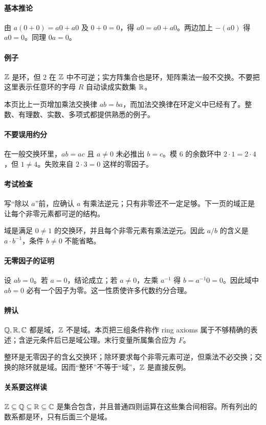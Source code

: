 \paragraph{基本推论}由 $a(0+0)=a0+a0$ 及 $0+0=0$，得 $a0=a0+a0$。两边加上 $-(a0)$ 得 $a0=0$。同理 $0a=0$。
\paragraph{例子}$\mathbb{Z}$ 是环，但 $2$ 在 $\mathbb{Z}$ 中不可逆；实方阵集合也是环，矩阵乘法一般不交换。不要把这里表示任意环的字母 $R$ 自动读成实数集 $\mathbb{R}$。

本页比上一页增加乘法交换律 $ab=ba$，而加法交换律在环定义中已经有了。整数、有理数、实数、多项式都提供熟悉的例子。
\paragraph{不要误用约分}在一般交换环里，$ab=ac$ 且 $a\ne0$ 未必推出 $b=c$。模 $6$ 的余数环中 $2\cdot1=2\cdot4$，但 $1\ne4$。失败来自 $2\cdot3=0$ 这样的零因子。
\paragraph{考试检查}写“除以 $a$”前，应确认 $a$ 有乘法逆元；只有非零还不一定足够。下一页的域正是让每个非零元素都可逆的结构。

域是满足 $0\ne1$ 的交换环，并且每个非零元素有乘法逆元。因此 $a/b$ 的含义是 $a\cdot b^{-1}$，条件 $b\ne0$ 不能省略。
\paragraph{无零因子的证明}设 $ab=0$。若 $a=0$，结论成立；若 $a\ne0$，左乘 $a^{-1}$ 得 $b=a^{-1}0=0$。因此域中 $ab=0$ 必有一个因子为零。这一性质使许多代数约分合理。
\paragraph{辨认}$\mathbb{Q},\mathbb{R},\mathbb C$ 都是域，$\mathbb{Z}$ 不是域。本页把三组条件称作 ring axioms 属于不够精确的表述；含逆元条件后已是域公理。末行变量所属集合应为 $F$。

整环是无零因子的含幺交换环；除环要求每个非零元素可逆，但乘法不必交换；交换的除环就是域。因而“整环”不等于“域”，$\mathbb{Z}$ 是直接反例。
\paragraph{关系要这样读}$\mathbb{Z}\subseteq\mathbb{Q}\subseteq\mathbb{R}\subseteq\mathbb C$ 是集合包含，并且普通四则运算在这些集合间相容。所有列出的数系都是环，只有后面三个是域。
